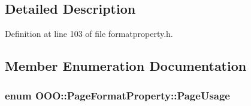 \subsection{Detailed Description}


Definition at line 103 of file formatproperty.\+h.



\subsection{Member Enumeration Documentation}
\hypertarget{classOOO_1_1PageFormatProperty_a3b4f1d357a8990fd17570f1154fb435f}{
\subsubsection[{Page\+Usage}]{\setlength{\rightskip}{0pt plus 5cm}enum {\bf O\+O\+O\+::\+Page\+Format\+Property\+::\+Page\+Usage}}}\label{classOOO_1_1PageFormatProperty_a3b4f1d357a8990fd17570f1154fb435f}
